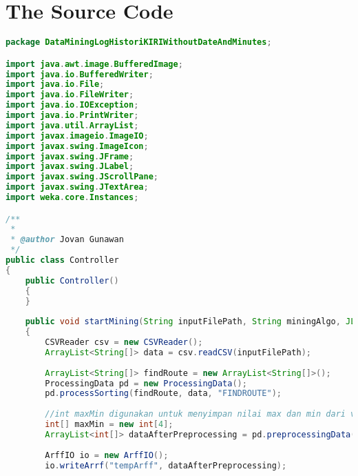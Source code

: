\chapter{The Source Code}
\label{app:B}

\singlespacing 
%
%
\begin{lstlisting}[language=Java,basicstyle=\tiny,caption=Controller.java]
package DataMiningLogHistoriKIRIWithoutDateAndMinutes;

import java.awt.image.BufferedImage;
import java.io.BufferedWriter;
import java.io.File;
import java.io.FileWriter;
import java.io.IOException;
import java.io.PrintWriter;
import java.util.ArrayList;
import javax.imageio.ImageIO;
import javax.swing.ImageIcon;
import javax.swing.JFrame;
import javax.swing.JLabel;
import javax.swing.JScrollPane;
import javax.swing.JTextArea;
import weka.core.Instances;

/**
 *
 * @author Jovan Gunawan
 */
public class Controller
{
    public Controller()
    {
    }
    
    public void startMining(String inputFilePath, String miningAlgo, JLabel label, JTextArea textArea) throws IOException
    {
        CSVReader csv = new CSVReader();
        ArrayList<String[]> data = csv.readCSV(inputFilePath);
        
        ArrayList<String[]> findRoute = new ArrayList<String[]>();
        ProcessingData pd = new ProcessingData();
        pd.processSorting(findRoute, data, "FINDROUTE");
        
        //int maxMin digunakan untuk menyimpan nilai max dan min dari variable bulan dan tahun. Untuk ketentuan posisi array dapat dilihat di method preprocessing data
        int[] maxMin = new int[4];
        ArrayList<int[]> dataAfterPreprocessing = pd.preprocessingData(findRoute, maxMin);
        
        ArffIO io = new ArffIO();
        io.writeArrf("tempArff", dataAfterPreprocessing);
        

\end{lstlisting}
